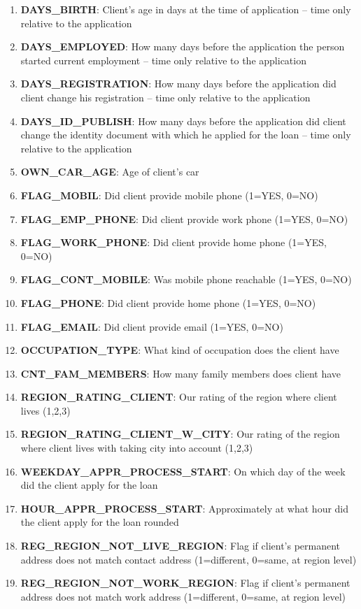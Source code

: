 \documentclass[12pt, letterpaper]{article}
\begin{document}
\begin{appendices}
\begin{enumerate}
  \item \textbf{DAYS_BIRTH}: Client's age in days at the time of application -- time only relative to the application
  \item \textbf{DAYS_EMPLOYED}: How many days before the application the person started current employment -- time only relative to the application
  \item \textbf{DAYS_REGISTRATION}: How many days before the application did client change his registration -- time only relative to the application
  \item \textbf{DAYS_ID_PUBLISH}: How many days before the application did client change the identity document with which he applied for the loan -- time only relative to the application
  \item \textbf{OWN_CAR_AGE}: Age of client's car
  \item \textbf{FLAG_MOBIL}: Did client provide mobile phone (1=YES, 0=NO)
  \item \textbf{FLAG_EMP_PHONE}: Did client provide work phone (1=YES, 0=NO)
  \item \textbf{FLAG_WORK_PHONE}: Did client provide home phone (1=YES, 0=NO)
  \item \textbf{FLAG_CONT_MOBILE}: Was mobile phone reachable (1=YES, 0=NO)
  \item \textbf{FLAG_PHONE}: Did client provide home phone (1=YES, 0=NO)
  \item \textbf{FLAG_EMAIL}: Did client provide email (1=YES, 0=NO)
  \item \textbf{OCCUPATION_TYPE}: What kind of occupation does the client have
  \item \textbf{CNT_FAM_MEMBERS}: How many family members does client have
  \item \textbf{REGION_RATING_CLIENT}: Our rating of the region where client lives (1,2,3)
  \item \textbf{REGION_RATING_CLIENT_W_CITY}: Our rating of the region where client lives with taking city into account (1,2,3)
  \item \textbf{WEEKDAY_APPR_PROCESS_START}: On which day of the week did the client apply for the loan
  \item \textbf{HOUR_APPR_PROCESS_START}: Approximately at what hour did the client apply for the loan	rounded
  \item \textbf{REG_REGION_NOT_LIVE_REGION}: Flag if client's permanent address does not match contact address (1=different, 0=same, at region level)
  \item \textbf{REG_REGION_NOT_WORK_REGION}: Flag if client's permanent address does not match work address (1=different, 0=same, at region level)

\end{enumerate}
\end{appendices}
\end{document}

